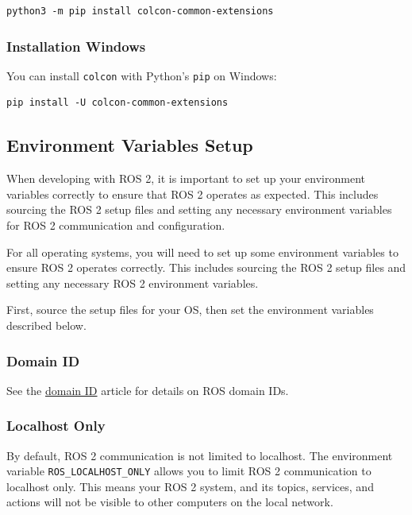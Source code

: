 \begin{verbatim}
python3 -m pip install colcon-common-extensions
\end{verbatim}

\subsubsection{Installation Windows}

You can install \texttt{colcon} with Python's \texttt{pip} on Windows:

\begin{verbatim}
pip install -U colcon-common-extensions
\end{verbatim}

\subsection{Environment Variables Setup}
\label{sec:env-vars-setup}

When developing with ROS 2, it is important to set up your environment variables correctly to ensure that ROS 2 operates as expected. This includes sourcing the ROS 2 setup files and setting any necessary environment variables for ROS 2 communication and configuration.

For all operating systems, you will need to set up some environment variables to ensure ROS 2 operates correctly. This includes sourcing the ROS 2 setup files and setting any necessary ROS 2 environment variables.

First, source the setup files for your OS, then set the environment variables described below.

\subsubsection{Domain ID}

See the \href{https://docs.ros.org/en/humble/Concepts/Intermediate/About-Domain-ID.html}{domain ID} article for details on ROS domain IDs.

\subsubsection{Localhost Only}

By default, ROS 2 communication is not limited to localhost. The environment variable \texttt{ROS\_LOCALHOST\_ONLY} allows you to limit ROS 2 communication to localhost only. This means your ROS 2 system, and its topics, services, and actions will not be visible to other computers on the local network.

